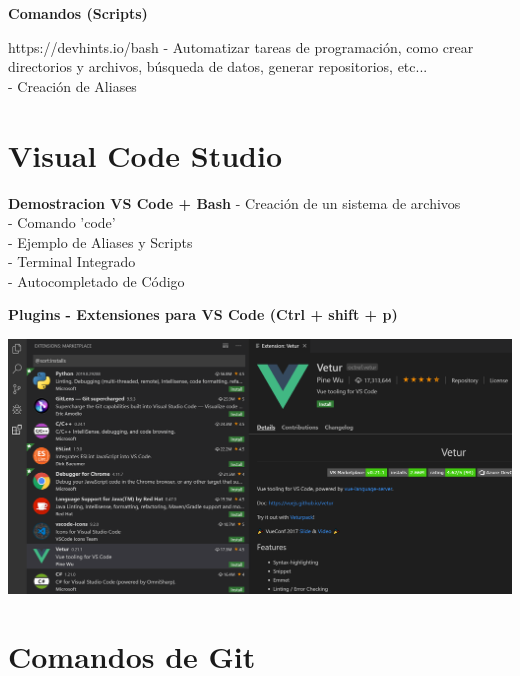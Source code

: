 \documentclass{beamer}
\begin{document}
\begin{frame}
	
	\textbf{Comandos (Scripts)}
	\begin{block}{https://devhints.io/bash}
		- Automatizar tareas de programación, como crear directorios y archivos, búsqueda de datos, generar repositorios, etc...\\
		\vspace{0.3cm}
		- Creación de Aliases
	\end{block}	
	
\end{frame}


\section{Visual Code Studio}
	\begin{frame}
		
		\begin{block}{\textbf{Demostracion VS Code + Bash}}
			- Creación de un sistema de archivos \\
			\vspace{0.3cm}
			- Comando 'code' \\
			\vspace{0.3cm}
			- Ejemplo de Aliases y Scripts \\
			\vspace{0.3cm}
			- Terminal Integrado \\
			\vspace{0.3cm}
			- Autocompletado de Código \\
		\end{block}	
		
	\end{frame}

	\begin{frame}
		\textbf{Plugins - Extensiones para VS Code (Ctrl + shift + p)}
		\begin{center}
			\includegraphics[scale=.3]{img/extensions.png}
		\end{center}

	\end{frame}

\section{Comandos de Git}
\end{document}

